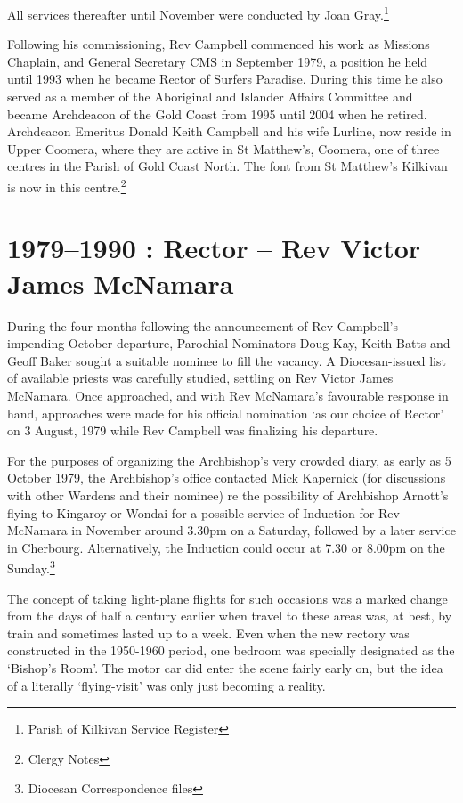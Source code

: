 All services thereafter until November were conducted by Joan
Gray.\footnote{Parish of Kilkivan Service Register}

Following his commissioning, Rev Campbell commenced his work as Missions
Chaplain, and General Secretary CMS in September 1979, a position he
held until 1993 when he became Rector of Surfers Paradise. During this
time he also served as a member of the Aboriginal and Islander Affairs
Committee and became Archdeacon of the Gold Coast from 1995 until 2004
when he retired. Archdeacon Emeritus Donald Keith Campbell and his wife
Lurline, now reside in Upper Coomera, where they are active in St
Matthew's, Coomera, one of three centres in the Parish of Gold Coast
North. The font from St Matthew's Kilkivan is now in this
centre.\footnote{Clergy Notes}

\printendnotes[custom]
\setcounter{endnote}{0}
\chapter{1979--1990 : Rector -- Rev Victor James
McNamara}

During the four months following the announcement of Rev Campbell's
impending October departure, Parochial Nominators Doug Kay, Keith Batts
and Geoff Baker sought a suitable nominee to fill the vacancy. A
Diocesan-issued list of available priests was carefully studied,
settling on Rev Victor James McNamara. Once approached, and with Rev
McNamara's favourable response in hand, approaches were made for his
official nomination `as our choice of Rector' on 3 August, 1979 while
Rev Campbell was finalizing his departure.

For the purposes of organizing the Archbishop's very crowded diary, as
early as 5 October 1979, the Archbishop's office contacted Mick
Kapernick (for discussions with other Wardens and their nominee) re the
possibility of Archbishop Arnott's flying to Kingaroy or Wondai for a
possible service of Induction for Rev McNamara in November around 3.30pm
on a Saturday, followed by a later service in Cherbourg. Alternatively,
the Induction could occur at 7.30 or 8.00pm on the Sunday.\footnote{Diocesan
  Correspondence files}

The concept of taking light-plane flights for such occasions was a
marked change from the days of half a century earlier when travel to
these areas was, at best, by train and sometimes lasted up to a week.
Even when the new rectory was constructed in the 1950-1960 period, one
bedroom was specially designated as the `Bishop's Room'. The motor car
did enter the scene fairly early on, but the idea of a literally
`flying-visit' was only just becoming a reality.

